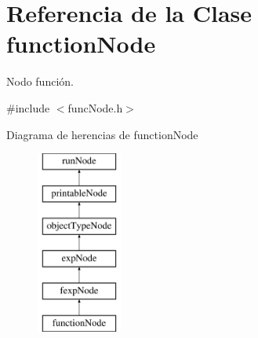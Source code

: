 \hypertarget{classfunctionNode}{\section{Referencia de la Clase function\-Node}
\label{classfunctionNode}
}


Nodo función.  




{\ttfamily \#include $<$func\-Node.\-h$>$}

Diagrama de herencias de function\-Node\begin{figure}[H]
\begin{center}
\leavevmode
\includegraphics[height=6.000000cm]{classfunctionNode}
\end{center}
\end{figure}
